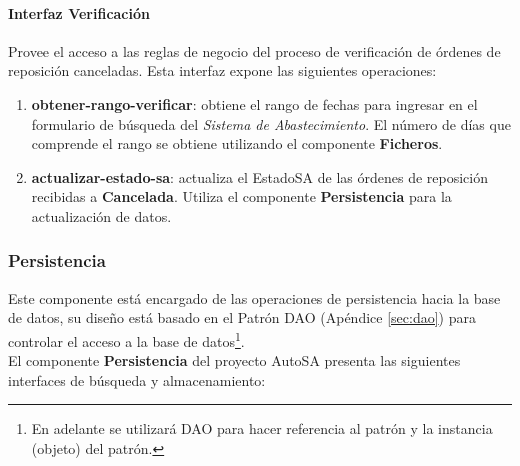 \paragraph{\indent Interfaz Verificación\\}
Provee el acceso a las reglas de negocio del proceso de verificación de órdenes de reposición canceladas. Esta interfaz expone las siguientes operaciones:
\begin{enumerate}
	\item \textbf{obtener-rango-verificar}: obtiene el rango de fechas para ingresar en el formulario de búsqueda del \textit{Sistema de Abastecimiento}. El número de días que comprende el rango se obtiene utilizando el componente \textbf{Ficheros}.
	\item \textbf{actualizar-estado-sa}: actualiza el EstadoSA de las órdenes de reposición recibidas a \textbf{Cancelada}. Utiliza el componente \textbf{Persistencia} para la actualización de datos.
\end{enumerate}

\subsubsection{Persistencia}
Este componente está encargado de las operaciones de persistencia hacia la base de datos, su diseño está basado en el Patrón DAO (Apéndice \ref{sec:dao}) para controlar el acceso a la base de datos\footnote{En adelante se utilizará DAO para hacer referencia al patrón y la instancia (objeto) del patrón.}.\\
El componente \textbf{Persistencia} del proyecto AutoSA presenta las siguientes interfaces de búsqueda y almacenamiento:

